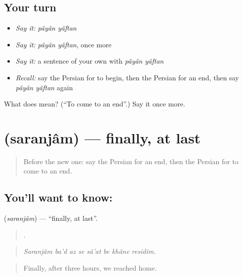 \subsection*{Your turn}
\begin{itemize}
\raggedright
  \item \emph{Say it:} \emph{pâyân yâftan}
  \item \emph{Say it:} \emph{pâyân yâftan}, once more
  \item \emph{Say it:} a sentence of your own with \emph{pâyân yâftan}
  \item \emph{Recall:} say the Persian for to begin, then the Persian for an end, then say \emph{pâyân yâftan} again
\end{itemize}

\begin{tcolorbox}[breakable,colback=teal!4,colframe=teal!35!black,title={Before you move on}]
What does   mean? (\textquotedblleft{}To come to an end\textquotedblright{}.) Say it once more.
\end{tcolorbox}
\section[\texorpdfstring{\fa{سرانجام} (saranjâm)}{سرانجام (saranjâm)}]{ (saranjâm) — finally, at last}

\label{lesson:FA-C302-saranjam}



\begin{quote}
Before the new one: say the Persian for an end, then the Persian for to come to an end.
\end{quote}

\subsection*{You'll want to know: }
\textbf{} (\emph{saranjâm}) — \textquotedblleft{}finally, at last\textquotedblright{}.

\begin{quote}
       .
\end{quote}

\begin{quote}
\emph{Saranjâm ba'd az se sâ'at be khâne residim.}
\end{quote}

\begin{quote}
Finally, after three hours, we reached home.
\end{quote}

